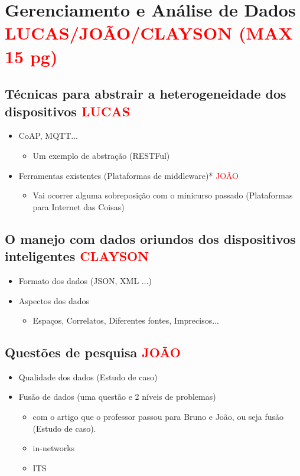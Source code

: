 
\section{Gerenciamento e Análise de Dados  \textcolor{red}{LUCAS/JOÃO/CLAYSON 
(MAX 15 pg)}}
\label{sec:GAD}

  \subsection{Técnicas para abstrair a heterogeneidade dos dispositivos 
\textcolor{red}{LUCAS}}
    \begin{itemize}
      \item CoAP, MQTT...
	\begin{itemize}
	  \item Um exemplo de abstração (RESTFul)
	\end{itemize}
      \item Ferramentas existentes (Plataformas de middleware)* 
\textcolor{red}{JOÃO}
	\begin{itemize}
	  \item Vai ocorrer alguma sobreposição com o minicurso passado 
(Plataformas para Internet das Coisas)
	\end{itemize}
    \end{itemize}

  \subsection{O manejo com dados oriundos dos dispositivos inteligentes 
\textcolor{red}{CLAYSON}}
    \begin{itemize}
      \item Formato dos dados (JSON, XML ...)
      \item Aspectos dos dados
      \begin{itemize}
	\item Espaços, Correlatos, Diferentes fontes, Imprecisos...
      \end{itemize}
    \end{itemize} 
      
  \subsection{Questões de pesquisa \textcolor{red}{JOÃO}}
    \begin{itemize}
      \item Qualidade dos dados (Estudo de caso)
      \item Fusão de dados (uma questão e 2 níveis de problemas)
      \begin{itemize}
	\item com o artigo que o professor passou para Bruno e 
João, ou seja fusão (Estudo de caso).
	\item in-networks
	\item ITS
      \end{itemize}
    \end{itemize}
